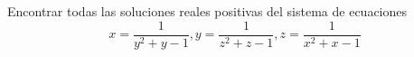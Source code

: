 Encontrar todas las soluciones reales positivas del sistema de ecuaciones
\[ x = \frac{1}{y^2 + y - 1}, y = \frac{1}{z^2 + z - 1}, z = \frac{1}{x^2 + x - 1} \]
